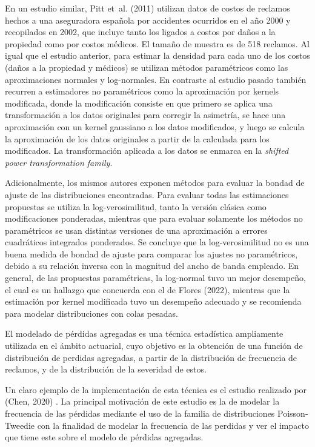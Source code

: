 \documentclass[
  letterpaper,
  onepage,
  openany]{scrreprt}
\begin{document}
En un estudio similar, Pitt et~al. (2011) utilizan datos de costos de
reclamos hechos a una aseguradora española por accidentes ocurridos en
el año 2000 y recopilados en 2002, que incluye tanto los ligados a
costos por daños a la propiedad como por costos médicos. El tamaño de
muestra es de 518 reclamos. Al igual que el estudio anterior, para
estimar la densidad para cada uno de los costos (daños a la propiedad y
médicos) se utilizan métodos paramétricos como las aproximaciones
normales y log-normales. En contraste al estudio pasado también recurren
a estimadores no paramétricos como la aproximación por kernels
modificada, donde la modificación consiste en que primero se aplica una
transformación a los datos originales para corregir la asimetría, se
hace una aproximación con un kernel gaussiano a los datos modificados, y
luego se calcula la aproximación de los datos originales a partir de la
calculada para los modificados. La transformación aplicada a los datos
se enmarca en la \emph{shifted power transformation family}.

Adicionalmente, los mismos autores exponen métodos para evaluar la
bondad de ajuste de las distribuciones encontradas. Para evaluar todas
las estimaciones propuestas se utiliza la log-verosimilitud, tanto la
versión clásica como modificaciones ponderadas, mientras que para
evaluar solamente los métodos no paramétricos se usan distintas
versiones de una aproximación a errores cuadráticos integrados
ponderados. Se concluye que la log-verosimilitud no es una buena medida
de bondad de ajuste para comparar los ajustes no paramétricos, debido a
su relación inversa con la magnitud del ancho de banda empleado. En
general, de las propuestas paramétricas, la log-normal tuvo un mejor
desempeño, el cual es un hallazgo que concuerda con el de Flores (2022),
mientras que la estimación por kernel modificada tuvo un desempeño
adecuado y se recomienda para modelar distribuciones con colas pesadas.

El modelado de pérdidas agregadas es una técnica estadística ampliamente
utilizada en el ámbito actuarial, cuyo objetivo es la obtención de una
función de distribución de perdidas agregadas, a partir de la
distribución de frecuencia de reclamos, y de la distribución de la
severidad de estos.

Un claro ejemplo de la implementación de esta técnica es el estudio
realizado por (Chen, 2020) . La principal motivación de este estudio es
la de modelar la frecuencia de las pérdidas mediante el uso de la
familia de distribuciones Poisson-Tweedie con la finalidad de modelar la
frecuencia de las perdidas y ver el impacto que tiene este sobre el
modelo de pérdidas agregadas.
\end{document}
